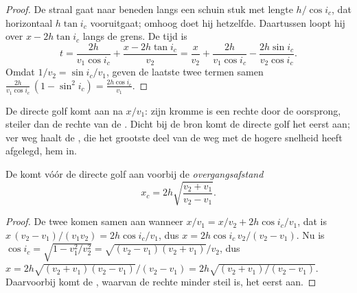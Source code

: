 \begin{proof}
De straal gaat naar beneden langs een schuin stuk met lengte $h/\cos i_c$, dat
horizontaal $h\tan i_c$ vooruitgaat; omhoog doet hij hetzelfde. Daartussen loopt
hij over $x - 2h\tan i_c$ langs de grens. De tijd is
\[
  t = \frac{2h}{v_1\cos i_c} + \frac{x - 2h\tan i_c}{v_2}
    = \frac{x}{v_2} + \frac{2h}{v_1\cos i_c} - \frac{2h\sin i_c}{v_2\cos i_c}.
\]
Omdat $1/v_2 = \sin i_c/v_1$, geven de laatste twee termen samen
$\frac{2h}{v_1\cos i_c}\,(1 - \sin^2 i_c) = \frac{2h\cos i_c}{v_1}$.
\end{proof}

De directe golf komt aan na $x/v_1$: zijn kromme is een rechte door de oorsprong,
steiler dan de rechte van de . Dicht bij de bron komt de directe golf het
eerst aan; ver weg haalt de , die het grootste deel van de weg met de hogere
snelheid heeft afgelegd, hem in.

\begin{proposition}[Overgangsafstand]\label{prop:g11:seismic-structure:crossover}
De  komt vóór de directe golf aan voorbij de
\emph{overgangsafstand}
\[
  x_c = 2h\sqrt{\frac{v_2 + v_1}{v_2 - v_1}}.
\]
\end{proposition}

\begin{proof}
De twee komen samen aan wanneer $x/v_1 = x/v_2 + 2h\cos i_c/v_1$, dat is
$x\,(v_2 - v_1)/(v_1 v_2) = 2h\cos i_c/v_1$, dus $x = 2h\cos i_c\,v_2/(v_2 -
v_1)$. Nu is $\cos i_c = \sqrt{1 - v_1^2/v_2^2} = \sqrt{(v_2 - v_1)(v_2 +
v_1)}/v_2$, dus $x = 2h\sqrt{(v_2 + v_1)(v_2 - v_1)}/(v_2 - v_1) =
2h\sqrt{(v_2 + v_1)/(v_2 - v_1)}$. Daarvoorbij komt de , waarvan de rechte
minder steil is, het eerst aan.
\end{proof}

